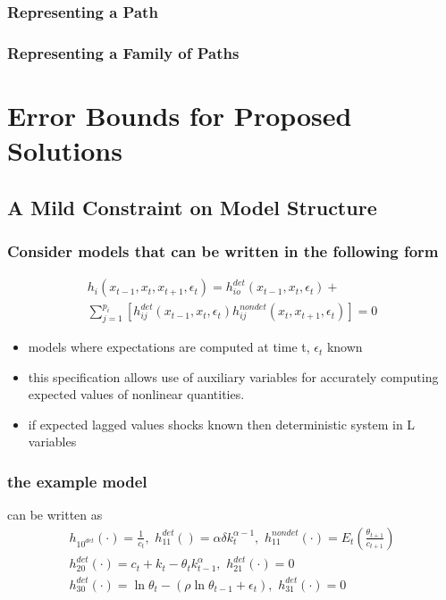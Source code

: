 \documentclass[tikz]{beamer}
\begin{document}
\begin{frame}
\frametitle{Representing a Path}

\end{frame}
\begin{frame}
\frametitle{Representing a Family of Paths}

\end{frame}





\section{Error Bounds for Proposed Solutions}





\subsection{A Mild Constraint on Model Structure}



\begin{frame}
\frametitle{Consider  models that can be written in  the following form}


\begin{gather}
  h_i(x_{t-1},x_{t},x_{t+1},\epsilon_t)=h^{det}_{io}(x_{t-1},x_{t},\epsilon_t)+\\ \sum_{j=1}^{p_i} [h^{det}_{ij}(x_{t-1},x_{t},\epsilon_t)h^{nondet}_{ij}(x_{t},x_{t+1},\epsilon_t)]=0
\end{gather}

\begin{itemize}
\item models where expectations are computed at time t, $\epsilon_t$  known
\item this specification allows use of auxiliary variables for 
accurately computing expected values of nonlinear quantities.
\item if expected lagged values shocks known then deterministic system in L variables
\end{itemize}

\end{frame}


\begin{frame}
\frametitle{the example  model }
\label{sec:simple-rbc-model-ext} can be written as
\begin{gather}
h_{10^{det}}(\cdot)=\frac{1}{c_t},\,\,
h_{11}^{det}()=\alpha \delta k_{t}^{\alpha-1} ,\,\,
h_{11}^{nondet}(\cdot)=E_t \left (\frac{\theta_{t+1}}{c_{t+1}} \right )\\
h_{20}^{det}(\cdot)=c_t + k_t-\theta_tk_{t-1}^\alpha,\,\,
h_{21}^{det}(\cdot)=0\\
h_{30}^{det}(\cdot)=\ln \theta_t -(\rho \ln \theta_{t-1} + \epsilon_t),\,\,
h_{31}^{det}(\cdot)=0
\end{gather}

\end{frame}
\end{document}
